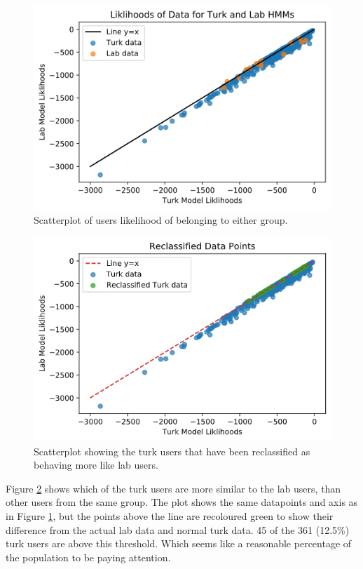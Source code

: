 \documentclass{article}
\begin{document}
\begin{figure}[ht!]
    \centering
    \includegraphics[scale=0.5]{Images/labturklikli.png}
    \caption{Scatterplot of users likelihood of belonging to either group. }
    \label{fig:unreclassified}
\end{figure}


\begin{figure}[ht!]
    \centering
    \includegraphics[scale=0.5]{Images/Reclassified-Data.png}
    \caption{Scatterplot showing the turk users that have been reclassified as behaving more like lab users. }
    \label{fig:Reclassified}
\end{figure}

Figure \ref{fig:Reclassified} shows which of the turk users are more similar to the lab users, than other users from the same group. 
The plot shows the same datapoints and axis as in Figure \ref{fig:unreclassified}, but the points above the line are recoloured green to show their difference from the actual lab data and normal turk data. 
45 of the 361 (12.5\%) turk users are above this threshold. 
Which seems like a reasonable percentage of the population to be paying attention. 
\end{document}
